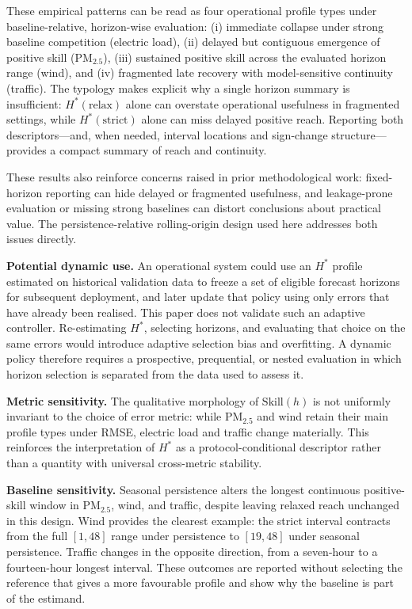 \documentclass[pdflatex]{sn-jnl}
\begin{document}
These empirical patterns can be read as four operational profile types under baseline-relative, horizon-wise evaluation: (i) immediate collapse under strong baseline competition (electric load), (ii) delayed but contiguous emergence of positive skill (PM$_{2.5}$), (iii) sustained positive skill across the evaluated horizon range (wind), and (iv) fragmented late recovery with model-sensitive continuity (traffic). The typology makes explicit why a single horizon summary is insufficient: $H^*(\mathrm{relax})$ alone can overstate operational usefulness in fragmented settings, while $H^*(\mathrm{strict})$ alone can miss delayed positive reach. Reporting both descriptors—and, when needed, interval locations and sign-change structure—provides a compact summary of reach and continuity.

These results also reinforce concerns raised in prior methodological work: fixed-horizon reporting can hide delayed or fragmented usefulness, and leakage-prone evaluation or missing strong baselines can distort conclusions about practical value. The persistence-relative rolling-origin design used here addresses both issues directly.

\textbf{Potential dynamic use.} An operational system could use an $H^*$
profile estimated on historical validation data to freeze a set of eligible
forecast horizons for subsequent deployment, and later update that policy
using only errors that have already been realised. This paper does not
validate such an adaptive controller. Re-estimating $H^*$, selecting horizons,
and evaluating that choice on the same errors would introduce adaptive
selection bias and overfitting. A dynamic policy therefore requires a
prospective, prequential, or nested evaluation in which horizon selection is
separated from the data used to assess it.

\textbf{Metric sensitivity.} The qualitative morphology of $\mathrm{Skill}(h)$ is not uniformly invariant to the choice of error metric: while PM$_{2.5}$ and wind retain their main profile types under RMSE, electric load and traffic change materially. This reinforces the interpretation of $H^*$ as a protocol-conditional descriptor rather than a quantity with universal cross-metric stability.

\textbf{Baseline sensitivity.} Seasonal persistence alters the longest
continuous positive-skill window in PM$_{2.5}$, wind, and traffic, despite
leaving relaxed reach unchanged in this design. Wind provides the clearest
example: the strict interval contracts from the full $[1,48]$ range under
persistence to $[19,48]$ under seasonal persistence. Traffic changes in the
opposite direction, from a seven-hour to a fourteen-hour longest interval.
These outcomes are reported without selecting the reference that gives a more
favourable profile and show why the baseline is part of the estimand.
\end{document}
